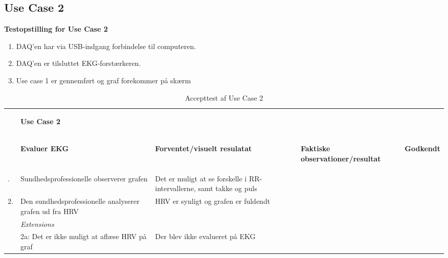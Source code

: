 
\subsection{Use Case 2}

\textbf{Testopstilling for Use Case 2}
\begin{enumerate}
	\item DAQ’en har via USB-indgang forbindelse til computeren.
	\item DAQ’en er tilsluttet EKG-forstærkeren.
	\item Use case 1 er gennemført og graf forekommer på skærm
\end{enumerate}

\begin{table}[H]
	\begin{tabularx}{\textwidth}{l X X X c}
	\toprule
	~ & \begin{large}\textbf{Use Case 2}\end{large} & ~ & ~ & ~\\
	~ & \begin{large}\textbf{Evaluer EKG} \end{large}
	& \begin{large}\textbf{Forventet/visuelt resulatat}\end{large}
	& \begin{large}\textbf{Faktiske observationer/resultat}\end{large}
	& \begin{large}\textbf{Godkendt}\end{large}
	\\			\midrule \addlinespace[3mm]
					1.	& Sundhedsprofessionelle observerer grafen
						& Det er muligt at se forskelle i RR-intervallerne, samt takke og puls
						& ~
						& %
						\\ \midrule
					2. 	& Den sundhedsprofessionelle analyserer grafen ud fra 		  HRV						
						& HRV er synligt og grafen er fuldendt 
						& ~
						& %
						\\ \midrule
     				~	& \textit{Extensions}
     					&	~
     					&	~		\\ \midrule
     				~ 	&	2a: Det er ikke muligt at aflæse HRV på graf
     					&   Der blev ikke evalueret på EKG 

     					&  %
     					    \\ 

		
	
	\bottomrule	
	\end{tabularx}
	\caption{Accepttest af Use Case 2}
	\label{tab:AT_UC2}
\end{table}


